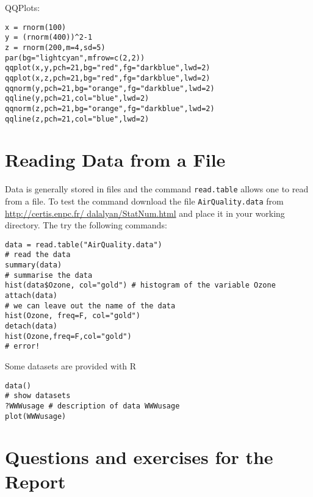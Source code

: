 \documentclass[a4paper,10pt]{article}
\begin{document}
\noindent
QQPlots: 
\begin{lstlisting}
x = rnorm(100)
y = (rnorm(400))^2-1
z = rnorm(200,m=4,sd=5)
par(bg="lightcyan",mfrow=c(2,2))
qqplot(x,y,pch=21,bg="red",fg="darkblue",lwd=2)
qqplot(x,z,pch=21,bg="red",fg="darkblue",lwd=2)
qqnorm(y,pch=21,bg="orange",fg="darkblue",lwd=2)
qqline(y,pch=21,col="blue",lwd=2)
qqnorm(z,pch=21,bg="orange",fg="darkblue",lwd=2)
qqline(z,pch=21,col="blue",lwd=2)
\end{lstlisting}

\section{Reading Data from a File} 

Data is generally stored in files and the command \texttt{read.table} allows one to read from a file. To test the command download the file \texttt{AirQuality.data} from \url{http://certis.enpc.fr/ dalalyan/StatNum.html} and place it in your working directory. The try the following commands: 

\begin{lstlisting}
data = read.table("AirQuality.data")
# read the data 
summary(data)
# summarise the data 
hist(data$Ozone, col="gold") # histogram of the variable Ozone
attach(data)
# we can leave out the name of the data 
hist(Ozone, freq=F, col="gold")
detach(data)
hist(Ozone,freq=F,col="gold")
# error! 
\end{lstlisting}

\noindent
Some datasets are provided with R

\begin{lstlisting}
data()
# show datasets 
?WWWusage # description of data WWWusage
plot(WWWusage)
\end{lstlisting}

\section{Questions and exercises for the Report} 
\end{document}
